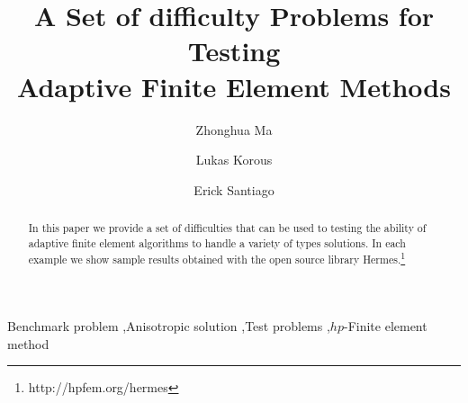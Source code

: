 \begin{frontmatter}

\title{A Set of difficulty Problems for Testing\\ Adaptive Finite Element Methods}

\author[label1]{Zhonghua Ma}
\author[label2]{Lukas Korous}
\author[label3]{Erick Santiago}
\address[label1]{China University of Petroleum, Beijing, China}
\address[label2]{Charles University, Prague, Czech Republic}
\address[label3]{University of Nevada, Reno, USA}

\begin{abstract}
In this paper we provide a set of difficulties that can be used to
testing the ability of adaptive finite element algorithms to handle
a variety of types solutions.
In each example we show sample results obtained with the
open source library {\sc Hermes}.\footnote{http://hpfem.org/hermes}
\end{abstract}

\begin{keyword}
Benchmark problem \sep Anisotropic solution \sep Test problems \sep $hp$-Finite element method
\end{keyword}

\end{frontmatter}
